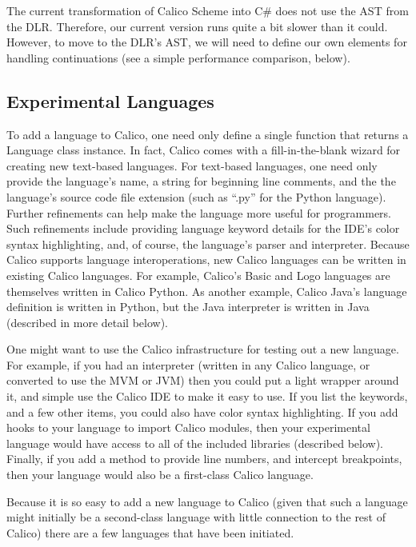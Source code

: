 \documentclass[preprint]{sigplanconf}
\begin{document}
The current transformation of Calico Scheme into C\# does not use the
AST from the DLR. Therefore, our current version runs quite a bit
slower than it could. However, to move to the DLR's AST, we will need
to define our own elements for handling continuations (see a
simple performance comparison, below).


\subsection{Experimental Languages}

To add a language to Calico, one need only define a single function
that returns a Language class instance. In fact, Calico comes with a
fill-in-the-blank wizard for creating new text-based languages. For
text-based languages, one need only provide the language's name, a
string for beginning line comments, and the the language's source code
file extension (such as ``.py'' for the Python language). Further
refinements can help make the language more useful for
programmers. Such refinements include providing language keyword
details for the IDE's color syntax highlighting, and, of course, the
language's parser and interpreter. Because Calico supports language
interoperations, new Calico languages can be written in existing
Calico languages. For example, Calico's Basic and Logo languages are
themselves written in Calico Python. As another example, Calico Java's
language definition is written in Python, but the Java interpreter is
written in Java (described in more detail below).

One might want to use the Calico infrastructure for testing out a new
language. For example, if you had an interpreter (written in any
Calico language, or converted to use the MVM or JVM) then you could
put a light wrapper around it, and simple use the Calico IDE to make
it easy to use. If you list the keywords, and a few other items, you
could also have color syntax highlighting. If you add hooks to your
language to import Calico modules, then your experimental language
would have access to all of the included libraries (described
below). Finally, if you add a method to provide line numbers, and
intercept breakpoints, then your language would also be a first-class
Calico language.

Because it is so easy to add a new language to Calico (given that such
a language might initially be a second-class language with little
connection to the rest of Calico) there are a few languages that have
been initiated.
\end{document}
